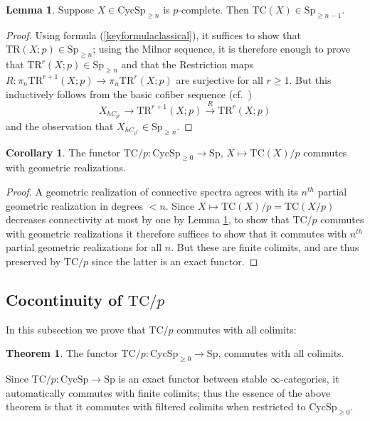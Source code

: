 \documentclass{amsart}
\newcommand{\Sp}{\mathrm{Sp}}
\theoremstyle{definition}
\newtheorem{lemma}[definition]{Lemma}
\newtheorem{corollary}[definition]{Corollary}
\newtheorem{theorem}[definition]{Theorem}
\newcommand{\TR}{\mathrm{TR}}
\newcommand{\CycSp}{\mathrm{CycSp}}
\newcommand{\TC}{\mathrm{TC}}
\begin{document}
\begin{lemma}
\label{connectivity}
Suppose $X \in \CycSp_{\geq n}$ is $p$-complete. Then $\TC(X) \in \Sp_{\geq n-1}$. 
\end{lemma}
\begin{proof}
Using formula (\ref{keyformulaclassical}), it suffices to show that $\TR(X;p) \in \Sp_{\geq n}$; using the Milnor sequence, it is therefore enough to prove that $\TR^r(X;p) \in \Sp_{\geq n}$ and that the
Restriction
maps $R:\pi_n\TR^{r+1}(X;p) \to \pi_n\TR^{r}(X;p)$ are surjective for all
$r\ge1$. But this inductively follows from the basic cofiber sequence
(cf.~\cite[Th.~1.2]{Hesselholt})
\begin{equation} \label{isotropysep}
X_{hC_{p^r}} \to \TR^{r+1}(X;p) \stackrel{R}{\to} \TR^r(X;p)
\end{equation}
and the observation that $X_{hC_{p^r}}\in \Sp_{\geq n}$.
\end{proof}

\begin{corollary}
\label{geometricreal}
The functor $ \TC/p:\CycSp_{\geq 0} \to \Sp$,
$X \mapsto \TC(X)/p$ 
commutes with geometric realizations.
\end{corollary}
\begin{proof} A geometric realization of connective spectra agrees with its $n^{th}$ partial geometric realization in degrees $<n$.  Since $X \mapsto \TC(X)/p=\TC(X/p)$ decreases connectivity at most by one by Lemma \ref{connectivity}, to show that $\TC/p$ commutes with geometric realizations it therefore suffices to show that it commutes with $n^{th}$ partial geometric realizations for all $n$.  But these are finite colimits, and are thus preserved by $\TC/p$ since the latter is an exact functor.\end{proof}


\subsection{Cocontinuity of $\TC/p$}\label{subsection_cocontinuity}

In this subsection we prove that $\TC/p$ commutes with all colimits:

\begin{theorem} 
\label{TCcommutes}
The functor $\TC/p: \CycSp_{\geq 0} \to \Sp$, commutes with all colimits. 
\end{theorem} 

Since $\TC/p : \CycSp \to \Sp$ is an exact functor between stable
$\infty$-categories, it automatically commutes with finite colimits; thus the
essence of the above theorem is that it commutes with filtered colimits when
restricted to $\CycSp_{\geq 0 }$.
\end{document}

